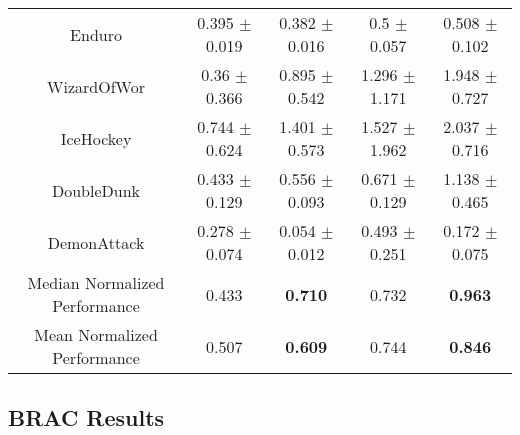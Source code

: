 \begin{table}[ht]
\begin{tabular}{ccccc}
    Enduro        &         0.395 $\pm$ 0.019 &         0.382 $\pm$ 0.016 &               0.5 $\pm$ 0.057 &             0.508 $\pm$ 0.102 \\
    WizardOfWor   &          0.36 $\pm$ 0.366 &         0.895 $\pm$ 0.542 &             1.296 $\pm$ 1.171 &             1.948 $\pm$ 0.727 \\
    IceHockey     &         0.744 $\pm$ 0.624 &         1.401 $\pm$ 0.573 &             1.527 $\pm$ 1.962 &             2.037 $\pm$ 0.716 \\
    DoubleDunk    &         0.433 $\pm$ 0.129 &         0.556 $\pm$ 0.093 &             0.671 $\pm$ 0.129 &             1.138 $\pm$ 0.465 \\
    DemonAttack   &         0.278 $\pm$ 0.074 &         0.054 $\pm$ 0.012 &             0.493 $\pm$ 0.251 &             0.172 $\pm$ 0.075 \\
    \midrule
    Median Normalized Performance & 0.433 & \textbf{0.710} & 0.732 & \textbf{0.963} \\
    Mean Normalized Performance & 0.507 & \textbf{0.609} &  0.744 & \textbf{0.846}  \\
    \bottomrule
    \end{tabular}

\end{table}

\subsection{BRAC Results}

